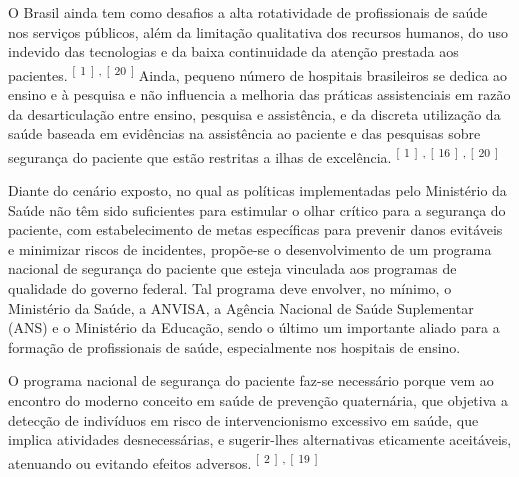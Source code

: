 \documentclass{article}
\begin{document}
O Brasil ainda tem como desafios a alta rotatividade de profissionais de saúde nos serviços
        públicos, além da limitação qualitativa dos recursos humanos, do uso indevido das
        tecnologias e da baixa continuidade da atenção prestada aos pacientes. %
\textsuperscript{[}%
\textsuperscript{1}
\textsuperscript{]}  
\textsuperscript{,}
\textsuperscript{[}%
\textsuperscript{20}
\textsuperscript{]}  
 Ainda, pequeno número de hospitais brasileiros se dedica ao ensino e à pesquisa e
        não influencia a melhoria das práticas assistenciais em razão da desarticulação entre
        ensino, pesquisa e assistência, e da discreta utilização da saúde baseada em evidências na
        assistência ao paciente e das pesquisas sobre segurança do paciente que estão restritas a
        ilhas de excelência. %
\textsuperscript{[}%
\textsuperscript{1}
\textsuperscript{]}  
\textsuperscript{,}
\textsuperscript{[}%
\textsuperscript{16}
\textsuperscript{]}  
\textsuperscript{,}
\textsuperscript{[}%
\textsuperscript{20}
\textsuperscript{]}  


Diante do cenário exposto, no qual as políticas implementadas pelo Ministério da Saúde não
        têm sido suficientes para estimular o olhar crítico para a segurança do paciente, com
        estabelecimento de metas específicas para prevenir danos evitáveis e minimizar riscos de
        incidentes, propõe-se o desenvolvimento de um programa nacional de segurança do paciente que
        esteja vinculada aos programas de qualidade do governo federal. Tal programa deve envolver,
        no mínimo, o Ministério da Saúde, a ANVISA, a Agência Nacional de Saúde Suplementar (ANS) e
        o Ministério da Educação, sendo o último um importante aliado para a formação de
        profissionais de saúde, especialmente nos hospitais de ensino.

O programa nacional de segurança do paciente faz-se necessário porque vem ao encontro do
        moderno conceito em saúde de prevenção quaternária, que objetiva a detecção de indivíduos em
        risco de intervencionismo excessivo em saúde, que implica atividades desnecessárias, e
        sugerir-lhes alternativas eticamente aceitáveis, atenuando ou evitando efeitos adversos.
\textsuperscript{[}%
\textsuperscript{2}
\textsuperscript{]}  
\textsuperscript{,}
\textsuperscript{[}%
\textsuperscript{19}
\textsuperscript{]}  
\end{document}
